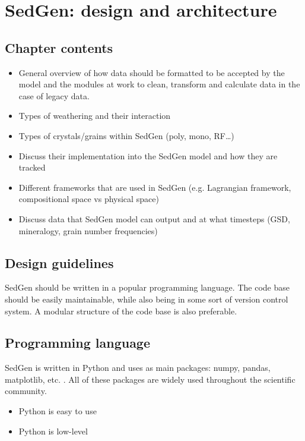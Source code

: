 \chapter{SedGen: design and architecture}\label{ch:sedgen_architecture}

%
%

\section{Chapter contents}
\begin{itemize}
    \item General overview of how data should be formatted to be accepted by the model and the modules at work to clean, transform and calculate data in the case of legacy data.
    \item Types of weathering and their interaction
    \item Types of crystals/grains within SedGen (poly, mono, RF…)
    \item Discuss their implementation into the SedGen model and how they are tracked
    \item Different frameworks that are used in SedGen (e.g. Lagrangian framework, compositional space vs physical space)
    \item Discuss data that SedGen model can output and at what timesteps (GSD, mineralogy, grain number frequencies)

\end{itemize}

\section{Design guidelines}
SedGen should be written in a popular programming language. %
The code base should be easily maintainable, while also being in some sort of version control system. %
A modular structure of the code base is also preferable. %


\section{Programming language}
SedGen is written in Python and uses as main packages: numpy, pandas, matplotlib, etc. . %
All of these packages are widely used throughout the scientific community. %
\begin{itemize}
    \item Python is easy to use
    \item Python is low-level
\end{itemize}



\cleardoublepage

